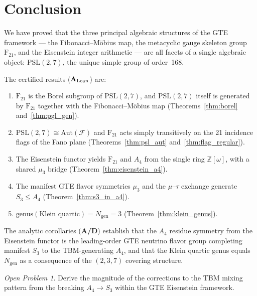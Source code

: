 \documentclass[11pt]{article}
\theoremstyle{remark}
\newtheorem{openprob}{Open Problem}
\newcommand{\Ngen}{\ensuremath{N_{\mathrm{gen}}}}
\newcommand{\PSLtwo}{\ensuremath{\mathrm{PSL}(2,7)}}
\newcommand{\FineSeven}{\ensuremath{\mathrm{F}_{21}}}
\newcommand{\AltFour}{\ensuremath{A_4}}
\newcommand{\Eisenstein}{\ensuremath{\mathbb{Z}[\omega]}}
\newcommand{\CatAL}{\ensuremath{\textbf{A}_{\rm Lean}}}
\newcommand{\CatAD}{\textbf{A/D}}
\begin{document}
\section{Conclusion}
\label{sec:conclusion}

We have proved that the three principal algebraic structures of the GTE
framework --- the Fibonacci--Möbius map, the metacyclic gauge skeleton group
$\FineSeven$, and the Eisenstein integer arithmetic --- are all facets of a
single algebraic object: $\PSLtwo$, the unique simple group of order~168.

The certified results (\CatAL{}) are:
\begin{enumerate}
  \item $\FineSeven$ is the Borel subgroup of $\PSLtwo$, and $\PSLtwo$ itself
    is generated by $\FineSeven$ together with the Fibonacci--Möbius map
    (Theorems~\ref{thm:borel} and~\ref{thm:pgl_gen}).
  \item $\PSLtwo \cong \mathrm{Aut}(\mathcal{F})$ and $\FineSeven$ acts simply
    transitively on the 21 incidence flags of the Fano plane
    (Theorems~\ref{thm:psl_aut} and~\ref{thm:flag_regular}).
  \item The Eisenstein functor yields $\FineSeven$ and $\AltFour$ from the
    single ring $\Eisenstein$, with a shared $\mu_3$ bridge
    (Theorem~\ref{thm:eisenstein_a4}).
  \item The manifest GTE flavor symmetries $\mu_3$ and the $\mu$--$\tau$
    exchange generate $S_3 \leq \AltFour$
    (Theorem~\ref{thm:s3_in_a4}).
  \item $\mathrm{genus}(\text{Klein quartic}) = \Ngen = 3$
    (Theorem~\ref{thm:klein_genus}).
\end{enumerate}

The analytic corollaries (\CatAD{}) establish that the $\AltFour$ residue
symmetry from the Eisenstein functor is the leading-order GTE neutrino flavor
group completing manifest $S_3$ to the TBM-generating $\AltFour$, and that
the Klein quartic genus equals $\Ngen$ as a consequence of the $(2,3,7)$
covering structure.

\begin{openprob}
Derive the magnitude of the corrections to the TBM mixing pattern from the
breaking $\AltFour \to S_3$ within the GTE Eisenstein framework.
\end{openprob}
\end{document}
